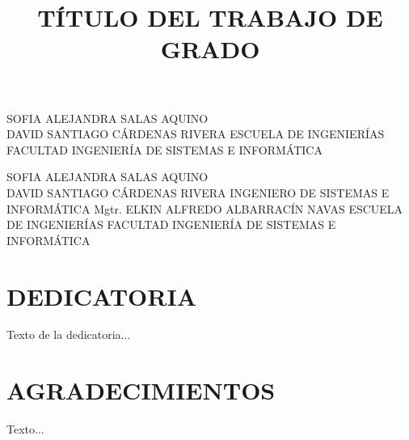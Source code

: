 \documentclass[spanish]{ieee_upb}
\title{TÍTULO DEL TRABAJO DE GRADO}
\date{\the\year}
\begin{document}
{SOFIA ALEJANDRA SALAS AQUINO \\ DAVID SANTIAGO CÁRDENAS RIVERA}
{ESCUELA DE INGENIERÍAS}
{FACULTAD INGENIERÍA DE SISTEMAS E INFORMÁTICA}

\newpage
{}
{SOFIA ALEJANDRA SALAS AQUINO \\ DAVID SANTIAGO CÁRDENAS RIVERA}
{INGENIERO DE SISTEMAS E INFORMÁTICA}
{Mgtr. ELKIN ALFREDO ALBARRACÍN NAVAS}
{ESCUELA DE INGENIERÍAS}
{FACULTAD INGENIERÍA DE SISTEMAS E INFORMÁTICA}

\newpage
\section*{DEDICATORIA}
Texto de la dedicatoria...

\clearpage
\section*{AGRADECIMIENTOS}
Texto...

\clearpage
\renewcommand\contentsname{\hfill\normalfont\bfseries CONTENIDO\hfill}
\tableofcontents

\renewcommand{\thetable}{\Roman{table}}


\makeatletter
\renewcommand{\numberline}[1]{%
  \stepcounter{tabindexcounter}%
  Tabla~\arabic{tabindexcounter}~%
}
\makeatother


\newpage
{} 
\renewcommand\listtablename{\hfill\normalfont\bfseries LISTA DE TABLAS\hfill}
\listoftables

\newpage
\renewcommand\listfigurename{\hfill\normalfont\bfseries LISTA DE FIGURAS\hfill}
\listoffigures


\end{document}
